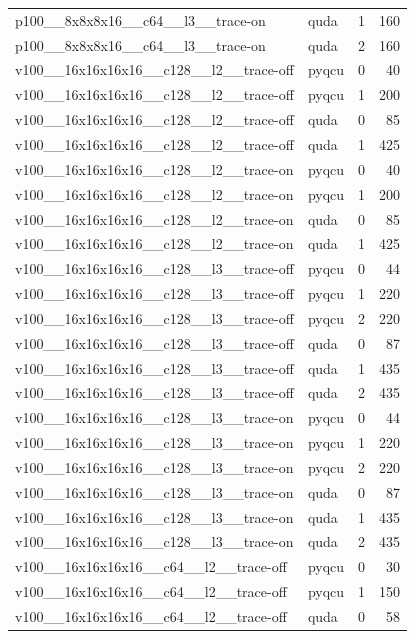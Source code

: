 \begin{table}[htbp]
\begin{tabular}{@{}llrr@{}}
p100\_\_8x8x8x16\_\_c64\_\_l3\_\_trace-on & quda & 1 & 160 \\
p100\_\_8x8x8x16\_\_c64\_\_l3\_\_trace-on & quda & 2 & 160 \\
v100\_\_16x16x16x16\_\_c128\_\_l2\_\_trace-off & pyqcu & 0 & 40 \\
v100\_\_16x16x16x16\_\_c128\_\_l2\_\_trace-off & pyqcu & 1 & 200 \\
v100\_\_16x16x16x16\_\_c128\_\_l2\_\_trace-off & quda & 0 & 85 \\
v100\_\_16x16x16x16\_\_c128\_\_l2\_\_trace-off & quda & 1 & 425 \\
v100\_\_16x16x16x16\_\_c128\_\_l2\_\_trace-on & pyqcu & 0 & 40 \\
v100\_\_16x16x16x16\_\_c128\_\_l2\_\_trace-on & pyqcu & 1 & 200 \\
v100\_\_16x16x16x16\_\_c128\_\_l2\_\_trace-on & quda & 0 & 85 \\
v100\_\_16x16x16x16\_\_c128\_\_l2\_\_trace-on & quda & 1 & 425 \\
v100\_\_16x16x16x16\_\_c128\_\_l3\_\_trace-off & pyqcu & 0 & 44 \\
v100\_\_16x16x16x16\_\_c128\_\_l3\_\_trace-off & pyqcu & 1 & 220 \\
v100\_\_16x16x16x16\_\_c128\_\_l3\_\_trace-off & pyqcu & 2 & 220 \\
v100\_\_16x16x16x16\_\_c128\_\_l3\_\_trace-off & quda & 0 & 87 \\
v100\_\_16x16x16x16\_\_c128\_\_l3\_\_trace-off & quda & 1 & 435 \\
v100\_\_16x16x16x16\_\_c128\_\_l3\_\_trace-off & quda & 2 & 435 \\
v100\_\_16x16x16x16\_\_c128\_\_l3\_\_trace-on & pyqcu & 0 & 44 \\
v100\_\_16x16x16x16\_\_c128\_\_l3\_\_trace-on & pyqcu & 1 & 220 \\
v100\_\_16x16x16x16\_\_c128\_\_l3\_\_trace-on & pyqcu & 2 & 220 \\
v100\_\_16x16x16x16\_\_c128\_\_l3\_\_trace-on & quda & 0 & 87 \\
v100\_\_16x16x16x16\_\_c128\_\_l3\_\_trace-on & quda & 1 & 435 \\
v100\_\_16x16x16x16\_\_c128\_\_l3\_\_trace-on & quda & 2 & 435 \\
v100\_\_16x16x16x16\_\_c64\_\_l2\_\_trace-off & pyqcu & 0 & 30 \\
v100\_\_16x16x16x16\_\_c64\_\_l2\_\_trace-off & pyqcu & 1 & 150 \\
v100\_\_16x16x16x16\_\_c64\_\_l2\_\_trace-off & quda & 0 & 58 \\

\end{tabular}
\end{table}
